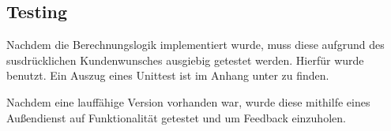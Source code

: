 \subsection{Testing}

Nachdem die Berechnungslogik implementiert wurde, muss diese aufgrund des susdrücklichen Kundenwunsches ausgiebig getestet werden. Hierfür wurde  benutzt. Ein Auszug eines Unittest ist im Anhang unter  zu finden.

Nachdem eine lauffähige Version vorhanden war, wurde diese mithilfe eines Außendienst  auf Funktionalität getestet und um Feedback einzuholen.